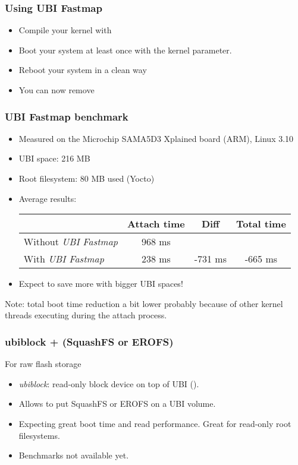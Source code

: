 \begin{frame}
\frametitle{Using UBI Fastmap}
\begin{itemize}
\item Compile your kernel with 
\item Boot your system at least once with the
       kernel parameter.
\item Reboot your system in a clean way
\item You can now remove 
\end{itemize}
\end{frame}

\begin{frame}
\frametitle{UBI Fastmap benchmark}
\begin{itemize}
\item Measured on the Microchip SAMA5D3 Xplained board (ARM), Linux 3.10
\item UBI space: 216 MB
\item Root filesystem: 80 MB used (Yocto)
\item Average results:
    \newline \newline
    \begin{tabular}{| l || c | c | c |}
    \hline
    & Attach time & Diff & Total time\\
    \hline
    Without {\em UBI Fastmap} & 968 ms & & \\
    With {\em UBI Fastmap} & 238 ms & -731 ms & -665 ms \\
    \hline
    \end{tabular}
    \newline
\item Expect to save more with bigger UBI spaces!
\end{itemize}
Note: total boot time reduction a bit lower probably
because of other kernel threads executing during the
attach process.
\end{frame}

\begin{frame}
\frametitle{ubiblock + (SquashFS or EROFS)}
For raw flash storage
\begin{itemize}
\item {\em ubiblock}: read-only block device on top of UBI
      ().
\item Allows to put SquashFS or EROFS on a UBI volume.
\item Expecting great boot time and read performance. Great
      for read-only root filesystems.
\item Benchmarks not available yet.
\end{itemize}
\end{frame}

